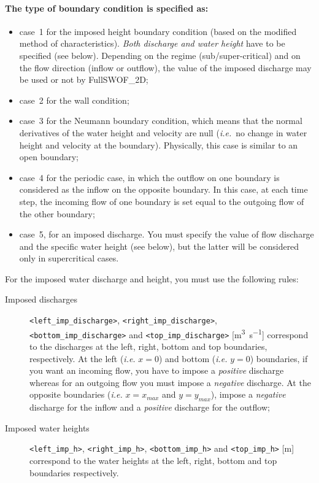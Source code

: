 \documentclass[a4paper, 11pt]{article}
\newcommand{\FullSWOF}{FullSWOF\_2D}
\begin{document}
\paragraph{The type of boundary condition is specified as:}
\begin{itemize}
	\item case~1 for the imposed height boundary condition (based on the modified method of characteristics).
	      \emph{Both discharge and water height} have to be specified (see below).
	      Depending on the regime (sub/super-critical) and on the flow direction (inflow or outflow), the value of the imposed discharge may be used or not by \FullSWOF\@;
	\item case~2 for the wall condition;
	\item case~3 for the Neumann boundary condition, which means that the normal derivatives of the water height and velocity are null (\textit{i.e.}\ no change in water height and velocity at the boundary).
	      Physically, this case is similar to an open boundary;
	\item case~4 for the periodic case, in which the outflow on one boundary is considered as the inflow on the opposite boundary.
	      In this case, at each time step, the incoming flow of one boundary is set equal to the outgoing flow of the other boundary;
	\item case~5, for an imposed discharge.
	      You must specify the value of flow discharge and the specific water height (see below), but the latter will be considered only in supercritical cases.
\end{itemize}
\medskip
For the imposed water discharge and height, you must use the following rules:
\begin{description}
	\item[Imposed discharges] \sloppy \texttt{<left\_imp\_discharge>}, \texttt{<right\_imp\_discharge>}, \texttt{<bottom\_imp\_discharge>} and \texttt{<top\_imp\_discharge>} [\si{\cubic\meter\per\second}] correspond to the discharges at the left, right, bottom and top boundaries, respectively.
	      At the left (\textit{i.e.} \(x=0\)) and bottom (\textit{i.e.} \(y=0\)) boundaries, if you want an incoming flow, you have to impose a \textit{positive} discharge whereas for an outgoing flow you must impose a \textit{negative} discharge.
	      \newline
	      At the opposite boundaries (\textit{i.e.} \(x=x_{max}\) and \(y=y_{max}\)), impose a \textit{negative} discharge
	      for the inflow and a \textit{positive} discharge for the outflow;
	\item[Imposed water heights] \texttt{<left\_imp\_h>}, \texttt{<right\_imp\_h>}, \texttt{<bottom\_imp\_h>} and \texttt{<top\_imp\_h>} [\si{\meter}] correspond to the water heights at the left, right, bottom and top boundaries respectively.
\end{description}
\end{document}

